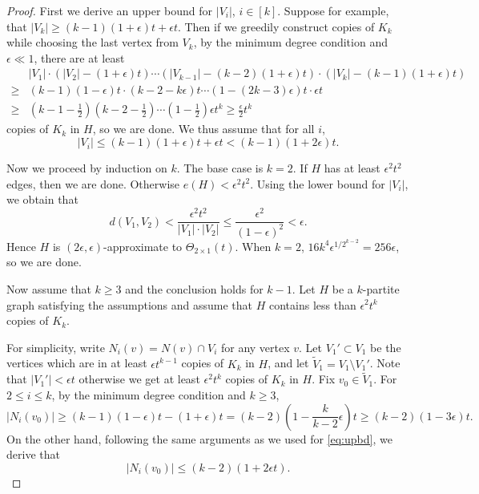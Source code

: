 \documentclass[reqno]{amsart}
\theoremstyle{plain}
\def\eps{\epsilon}
\begin{document}
\begin{proof}
First we derive an upper bound for $|V_i|$, $i\in [k]$.  Suppose for example, that $|V_k|\ge (k-1)(1+\epsilon)t+\epsilon t$. Then if we greedily construct copies of $K_k$ while choosing the last vertex from $V_k$, by the minimum degree condition and $\epsilon\ll 1$, there are at least
\begin{align*}
& |V_1|\cdot (|V_2|-(1+\epsilon)t) \cdots (|V_{k-1}|-(k-2)(1+\epsilon)t)\cdot (|V_k|-(k-1)(1+\epsilon)t)\\
\ge & (k-1)(1-\epsilon)t\cdot (k-2 -k\epsilon)t \cdots (1-(2k-3)\epsilon) t\cdot \epsilon t\\
\ge & (k-1 - \tfrac12) (k-2 - \tfrac12) \cdots (1- \tfrac12) \epsilon t^k \ge \tfrac{\epsilon}2 t^k
\end{align*}
copies of $K_k$ in $H$, so we are done. We thus assume that for all $i$,
\begin{equation}\label{eq:upbd}
|V_i|\le (k-1)(1+\epsilon)t+\epsilon t < (k-1)(1+ 2\epsilon)t.
\end{equation}

Now we proceed by induction on $k$. The base case is $k=2$. If $H$ has at least $\epsilon^2 t^2$ edges, then we are done. Otherwise $e(H)<\epsilon^2 t^2$. Using the lower bound for $|V_i|$, we obtain that
$$
d(V_1,V_2)<\frac{\epsilon^2 t^2}{|V_1|\cdot |V_2|}\le \frac{\epsilon^2}{(1-\epsilon)^2}<\epsilon.
$$
Hence $H$ is $(2\epsilon,\epsilon)$-approximate to $\Theta_{2\times 1}(t)$. When $k=2$,  $16 k^4 \epsilon^{1/{2^{k -2} }}= 256 \eps$, so we are done.

Now assume that $k\ge 3$ and the conclusion holds for $k-1$. Let $H$ be a $k$-partite graph satisfying the assumptions and assume that $H$ contains less than $ \epsilon^2 t^k$ copies of $K_k$.

For simplicity, write $N_i(v)=N(v)\cap V_i$ for any vertex $v$. Let $V_1'\subset V_1$ be the vertices which are in at least $\eps t^{k-1}$ copies of $K_k$ in $H$, and let $\tilde V_1 = V_1\setminus V_1'$. Note that $|V_1'| < \eps t$ otherwise we get at least $\eps^2 t^k$ copies of $K_k$ in $H$. Fix $v_0 \in \tilde V_1$. For $2\le i\le k$, by the minimum degree condition and $k\ge 3$,
\[
|N_i(v_0)| \ge (k-1)(1-\epsilon)t - (1 + \eps) t = (k-2) \left( 1-\frac k{k-2}\eps \right)t \ge (k-2)(1-3\eps)t.
\]
On the other hand, following the same arguments as we used for \eqref{eq:upbd}, we derive that
\begin{equation}\label{eq:upbd2}
|N_i(v_0)| \le (k - 2)(1 + 2\eps t).
\end{equation}


\end{proof}
\end{document}
